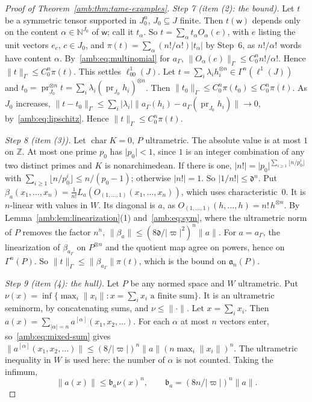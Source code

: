 \documentclass[11pt]{amsart}
\theoremstyle{definition}
\theoremstyle{remark}
\numberwithin{equation}{section}
\newcommand{\N}{\mathbb N}
\newcommand{\Z}{\mathbb Z}
\newcommand{\abs}[1]{\lvert #1\rvert}
\newcommand{\norm}[1]{\lVert #1\rVert}
\theoremstyle{plain}
\theoremstyle{definition}
\theoremstyle{plain}
\begin{document}
\begin{proof}[Proof of Theorem~\ref{amb:thm:tame-examples}]
\emph{Step 7 (item (2): the bound).} Let $t$ be a symmetric tensor supported in $J_0^n$, $J_0\subseteq J$ finite. Then $t(\mathsf w)$
depends only on the content $\alpha\in\N^{J_0}$ of $\mathsf w$; call it $t_\alpha$. So $t=\sum_\alpha t_\alpha O_\alpha(e)$, with $e$
listing the unit vectors $e_c$, $c\in J_0$, and $\pi(t)=\sum_\alpha(n!/\alpha!)\abs{t_\alpha}$ by Step~6, as $n!/\alpha!$ words have
content $\alpha$. By~\eqref{amb:eq:multinomial} for $a_\Gamma$, $\norm{O_\alpha(e)}_\Gamma\le C_0^nn!/\alpha!$. Hence
$\norm t_\Gamma\le C_0^n\pi(t)$. This settles $\ell^1_{00}(J)$. Let $t=\sum_i\lambda_ih_i^{\otimes n}\in\Gamma^n(\ell^1(J))$ and
$t_0=\operatorname{pr}_{J_0}^{\otimes n}t=\sum_i\lambda_i(\operatorname{pr}_{J_0}h_i)^{\otimes n}$. Then
$\norm{t_0}_\Gamma\le C_0^n\pi(t_0)\le C_0^n\pi(t)$. As $J_0$ increases,
$\norm{t-t_0}_\Gamma\le\sum_i\abs{\lambda_i}\norm{a_\Gamma(h_i)-a_\Gamma(\operatorname{pr}_{J_0}h_i)}\to0$, by~\eqref{amb:eq:lipschitz}.
Hence $\norm t_\Gamma\le C_0^n\pi(t)$.

\emph{Step 8 (item (3)).} Let $\operatorname{char}K=0$, $P$ ultrametric. The absolute value is at most $1$ on $\Z$. At most one prime $p_0$
has $\abs{p_0}<1$, since $1$ is an integer combination of any two distinct primes and $K$ is nonarchimedean. If there is one,
$\abs{n!}=\abs{p_0}^{\sum_{i\ge1}\lfloor n/p_0^i\rfloor}$ with $\sum_{i\ge1}\lfloor n/p_0^i\rfloor\le n/(p_0-1)$; otherwise
$\abs{n!}=1$. So $\abs{1/n!}\le\mathfrak d^n$. Put
$\beta_a(x_1,\dots,x_n)=\frac1{n!}L_a(O_{(1,\dots,1)}(x_1,\dots,x_n))$, which uses characteristic~$0$. It is
$n$\nobreakdash-linear with values in $W$. Its diagonal is $a$, as $O_{(1,\dots,1)}(h,\dots,h)=n!\,h^{\otimes n}$. By
Lemma~\ref{amb:lem:linearization}(1) and~\eqref{amb:eq:sym}, where the ultrametric norm of $P$ removes the factor $n^n$,
$\norm{\beta_a}\le(8\mathfrak d/\abs\varpi^2)^n\norm a$. For $a=a_\Gamma$, the linearization of
$\beta_{a_\Gamma}$ on $P^{\otimes n}$ and the quotient map agree on powers, hence on $\Gamma^n(P)$. So
$\norm t_\Gamma\le\norm{\beta_{a_\Gamma}}\pi(t)$, which is the bound on $\mathfrak a_n(P)$.

\emph{Step 9 (item (4): the hull).} Let $P$ be any normed space and $W$ ultrametric. Put
$\nu(x)=\inf\{\max_i\norm{x_i}:x=\sum_ix_i\text{ a finite sum}\}$. It is an ultrametric seminorm, by concatenating sums, and
$\nu\le\norm\cdot$. Let $x=\sum_ix_i$. Then $a(x)=\sum_{\abs\alpha=n}a^{[\alpha]}(x_1,x_2,\dots)$. For each $\alpha$ at most $n$
vectors enter, so~\eqref{amb:eq:mixed-sum} gives $\norm{a^{[\alpha]}(x_1,x_2,\dots)}\le(8/\abs\varpi)^n\norm a(n\max_i\norm{x_i})^n$.
The ultrametric inequality in $W$ is used here: the number of $\alpha$ is not counted. Taking the infimum,
\begin{equation}\label{amb:d:eq:hull-bound}
 \norm{a(x)}\le \mathfrak b_a\nu(x)^n,\qquad \mathfrak b_a=(8n/\abs\varpi)^n\norm a.
\end{equation}


\end{proof}
\end{document}
